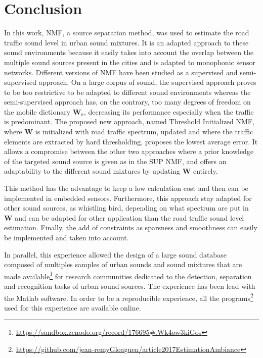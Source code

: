 \documentclass[twocolumn,a4paper,10pt]{article}
\begin{document}
\section{Conclusion}

In this work, NMF, a source separation method, was used to estimate the road traffic sound level in urban sound mixtures. It is an adapted approach to these sound environments because it easily takes into account the overlap between the multiple sound sources present in the cities and is adapted to monophonic sensor networks. Different versions of NMF have been studied as a supervised and semi-supervised approach. On a large corpus of sound, the supervised approach proves to be too restrictive to be adapted to different sound environments whereas the semi-supervised approach has, on the contrary, too many degrees of freedom on the mobile dictionary $\mathbf{W_r}$, decreasing its performance especially when the traffic is predominant. The proposed new approach, named Threshold Initialized NMF, where $\mathbf{W}$ is initialized with road traffic spectrum, updated and where the traffic elements are extracted by hard thresholding, proposes the lowest average error. It allows a compromise between the other two approaches where a prior knowledge of the targeted sound source is given as in the SUP NMF, and offers an adaptability to the different sound mixtures by updating $ \mathbf{W}$ entirely.

This method has the advantage to keep a low calculation cost and then can be implemented in embedded sensors. Furthermore, this approach stay adapted for other sound sources, as whistling bird, depending on what spectrum are put in $\mathbf{W}$ and can be adapted for other application than the road traffic sound level estimation. Finally, the add of constraints as sparsness \cite{hoyer2004non} and smoothness \cite{virtanen_monaural_2007} can easily be implemented and taken into account.

In parallel, this experience allowed the design of a large sound database composed of multiples samples of urban sounds and sound mixtures that are made available\footnote{\url{https://sandbox.zenodo.org/record/176695#.Wk4ow3kiGos}} for research communities dedicated to the detection, separation and recognition tasks of urban sound sources.
The experience has been lead with the Matlab software. In order to be a reproducible experience, all the programs\footnote{\url{https://github.com/jean-remyGloaguen/article2017EstimationAmbiance}} used for this experience are available online.

\footnotesize


\end{document}
